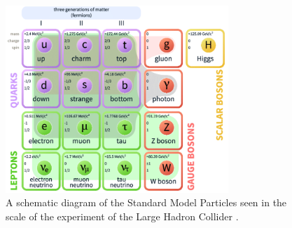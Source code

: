     \begin{figure}[!htb]
        \begin{center}
            \includegraphics[width=0.75\textwidth]{figures/chapter_SM/SM}
            \caption{
                A schematic diagram of the Standard Model Particles seen in the scale of the experiment of the Large Hadron Collider \cite{enwiki:1060203113}.
            }
            \label{fig:SM}
        \end{center}
    \end{figure}


%
%
%
%
%





